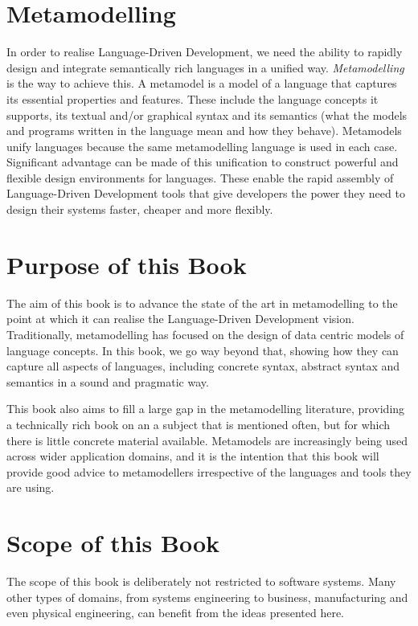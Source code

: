 \section*{Metamodelling}

In order to realise Language-Driven Development, we need the
ability to rapidly design and integrate semantically rich
languages in a unified way. {\em Metamodelling} is the way to
achieve this. A metamodel is a model of a language that captures
its essential properties and features. These include the language
concepts it supports, its textual and/or graphical syntax and its
semantics (what the models and programs written in the language
mean and how they behave). Metamodels unify languages because the
same metamodelling language is used in each case. Significant
advantage can be made of this unification to construct powerful
and flexible design environments for languages. These enable the
rapid assembly of Language-Driven Development tools that give
developers the power they need to design their systems faster,
cheaper and more flexibly.

\section*{Purpose of this Book}

The aim of this book is to advance the state of the art in
metamodelling to the point at which it can realise the
Language-Driven Development vision. Traditionally, metamodelling
has focused on the design of data centric models of language
concepts. In this book, we go way beyond that, showing how they
can capture all aspects of languages, including concrete syntax,
abstract syntax and semantics in a sound and pragmatic way.

This book also aims to fill a large gap in the metamodelling
literature, providing a technically rich book on an a subject that
is mentioned often, but for which there is little concrete
material available. Metamodels are increasingly being used across
wider application domains, and it is the intention that this book
will provide good advice to metamodellers irrespective of the
languages and tools they are using.

\section*{Scope of this Book}

The scope of this book is deliberately not restricted to software
systems. Many other types of domains, from systems engineering to
business, manufacturing and even physical engineering, can benefit
from the ideas presented here.

